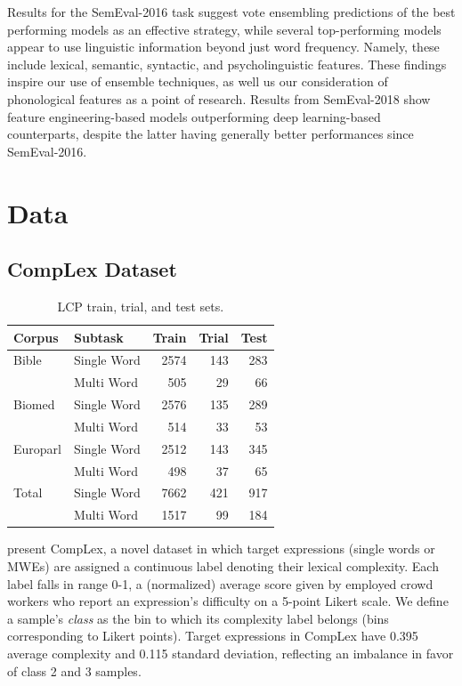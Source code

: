 \documentclass[11pt,a4paper]{article}
\begin{document}
Results for the SemEval-2016 task \citep{zampieriEtAl:2017:NLPTEA} suggest vote ensembling predictions of the best performing models as an effective strategy, while several top-performing models \citep{paetzoldspecia2016sv000gg, ronzanoetal2016taln, mukherjeeetal2016ju} appear to use linguistic information beyond just word frequency. Namely, these include lexical, semantic, syntactic, and psycholinguistic features. These findings inspire our use of ensemble techniques, as well us our consideration of phonological features as a point of research. Results from SemEval-2018 show feature engineering-based models outperforming deep learning-based counterparts, despite the latter having generally better performances since SemEval-2016.

\section{Data}

\subsection{CompLex Dataset}

\begin{table}
  \centering
  \begin{tabular}{l|l|r|r|r}
    \toprule
    \centering
    Corpus & Subtask & Train &  Trial &  Test \\
    \midrule
    Bible & Single Word &   2574 &    143 &   283 \\
            & Multi Word &    505 &     29 &    66 \\
    Biomed & Single Word &   2576 &    135 &   289 \\
            & Multi Word &    514 &     33 &    53 \\
    Europarl & Single Word &   2512 &    143 &   345 \\
            & Multi Word &    498 &     37 &    65 \\
    \midrule
    Total & Single Word & 7662 & 421 & 917 \\
          & Multi Word &    1517 &     99 &    184 \\
    \bottomrule
  \end{tabular}
  \caption{\label{tab:datasets} LCP train, trial, and test sets.}
\end{table}

\citet{shardlow2020complex} present CompLex, a novel dataset in which target expressions (single words or MWEs) are assigned a continuous label denoting their lexical complexity. Each label falls in range 0-1, a (normalized) average score given by employed crowd workers who report an expression's difficulty on a 5-point Likert scale. We define a sample's \textit{class} as the bin to which its complexity label belongs (bins corresponding to Likert points). Target expressions in CompLex have 0.395 average complexity and 0.115 standard deviation, reflecting an imbalance in favor of class 2 and 3 samples. 
\end{document}
